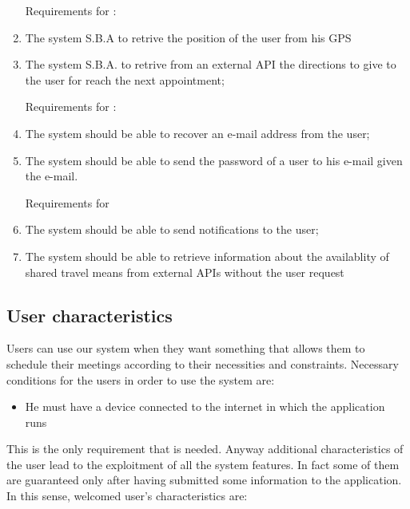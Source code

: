 \begin{enumerate}
Requirements for :

\item The system S.B.A to retrive the position of the user from his GPS

\item The system S.B.A. to retrive from an external API the directions to give to the user for reach the next appointment;


Requirements for :

\item The system should be able to recover an e-mail address from the user;

\item The system should be able to send the password of a user to his e-mail given the e-mail.

Requirements for 

\item The system should be able to send notifications to the user;

\item The system should be able to retrieve information about the availablity of shared travel means from external APIs without the user request 

\end{enumerate}

\subsection{User characteristics}
Users can use our system when they want something that allows them to schedule their meetings according to their necessities and constraints. Necessary conditions for the users in order to use the system are: 

\begin{itemize}
\item He must have a device connected to the internet in which the application runs
\end{itemize}

This is the only requirement that is needed. Anyway additional characteristics of the user lead to the exploitment of all the system features. In fact some of them are guaranteed only after having submitted some information to the application.
In this sense, welcomed user's characteristics are:

